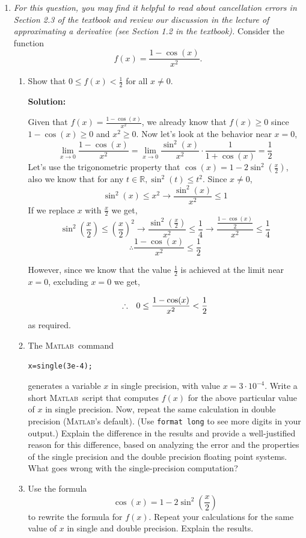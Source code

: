 \documentclass[11pt]{article}
\newcommand{\matlab}{\textsc{Matlab\ }}
\newcommand{\matlabns}{\textsc{Matlab}}
\newenvironment{solution}
  {\par\noindent\textbf{Solution:}\par}
  {\par}
\begin{document}
\begin{enumerate}
\begin{enumerate}
\begin{solution}
  \end{solution}
\end{enumerate}

\item {\em For this question, you may find it helpful to read about cancellation errors in Section 2.3 of the textbook and review our discussion in the lecture of approximating a derivative (see Section 1.2 in the textbook).} Consider the function 
$$ f(x) = \frac{1-\cos(x)}{x^2}.$$ 
\begin{enumerate}
\item Show that  $0 \leq f(x) < \frac12$ for all $x \ne 0$.
  \begin{solution}
  Given that $f(x) = \frac{1-\cos(x)}{x^2}$, we already know that $f(x) \ge 0$ since $1-\cos(x) \ge 0$ and $x^2 \ge 0$.
  Now let's look at the behavior near $x=0$, 
  $$\lim_{x \to 0} \frac{1-\cos(x)}{x^2} = \lim_{x \to 0} \frac{\sin^2(x)}{x^2} \cdot \frac{1}{1+\cos(x)} = \frac{1}{2}$$  
  Let's use the trigonometric property that $\cos(x) = 1-2\sin^2(\frac{x}{2})$, also we know that for any $t \in \mathbb{R}, \sin^2(t) \le t^2$.
  Since $x\neq 0$, 
  $$\sin^2(x) \le x^2 \to \frac{\sin^2(x)}{x^2} \le 1$$
  If we replace $x$ with $\frac{x}{2}$ we get,
  $$\sin^2(\frac{x}{2}) \le (\frac{x}{2})^2 \to \frac{\sin^2(\frac{x}{2})}{x^2} \le \frac{1}{4} \to \frac{\frac{1-\cos(x)}{2}}{x^2} \le \frac{1}{4}$$
  $$\therefore \frac{1-\cos(x)}{x^2} \le \frac{1}{2}$$

  However, since we know that the value $\frac{1}{2}$ is achieved at the limit near $x=0$, excluding $x=0$ we get,

  $$\therefore \hspace{.1in} 0 \le \frac{1-\cos(x)}{x^2} < \frac{1}{2}$$
  as required.

\end{solution}

\item 
The \matlab command
\begin{verbatim}
x=single(3e-4);
\end{verbatim}
generates a variable $x$ in single precision, with value $x=3 \cdot 10^{-4}$. 
Write a short \matlab script that computes $f(x)$ for the above particular value of $x$ in single precision. Now, repeat the same calculation in double precision (\matlabns's default).  (Use {\tt format long} to see more digits in your output.)
Explain the difference in the results and provide  a well-justified reason for this difference, based on analyzing the error and  the properties of the single precision and the double precision floating point systems. What goes wrong with the single-precision computation?
\item Use the formula
$$ \cos(x) = 1-2 \sin^2 \left( \frac{x}{2} \right) $$ to rewrite the formula for $f(x)$. Repeat your calculations for the same value of $x$ in single and double precision.  Explain the results.
\end{enumerate}


\end{enumerate}
\end{document}

